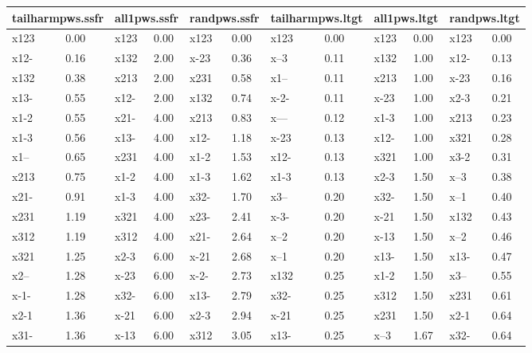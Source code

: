 
\begin{longtable}{| l | l || l | l || l | l || l | l || l | l || l | l |}
\hline
\multicolumn{2}{|c|}{\textbf{tailharmpws.ssfr}} & \multicolumn{2}{|c|}{\textbf{all1pws.ssfr}} & \multicolumn{2}{|c|}{\textbf{randpws.ssfr}} & \multicolumn{2}{|c|}{\textbf{tailharmpws.ltgt}} & \multicolumn{2}{|c|}{\textbf{all1pws.ltgt}} & \multicolumn{2}{|c|}{\textbf{randpws.ltgt}}\\
\hline
x123 & 0.00  & x123 & 0.00  & x123 & 0.00  & x123 & 0.00  & x123 & 0.00  & x123 & 0.00 \\
\hline
x12- & 0.16  & x132 & 2.00  & x-23 & 0.36  & x--3 & 0.11  & x132 & 1.00  & x12- & 0.13 \\
\hline
x132 & 0.38  & x213 & 2.00  & x231 & 0.58  & x1-- & 0.11  & x213 & 1.00  & x-23 & 0.16 \\
\hline
x13- & 0.55  & x12- & 2.00  & x132 & 0.74  & x-2- & 0.11  & x-23 & 1.00  & x2-3 & 0.21 \\
\hline
x1-2 & 0.55  & x21- & 4.00  & x213 & 0.83  & x--- & 0.12  & x1-3 & 1.00  & x213 & 0.23 \\
\hline
x1-3 & 0.56  & x13- & 4.00  & x12- & 1.18  & x-23 & 0.13  & x12- & 1.00  & x321 & 0.28 \\
\hline
x1-- & 0.65  & x231 & 4.00  & x1-2 & 1.53  & x12- & 0.13  & x321 & 1.00  & x3-2 & 0.31 \\
\hline
x213 & 0.75  & x1-2 & 4.00  & x1-3 & 1.62  & x1-3 & 0.13  & x2-3 & 1.50  & x--3 & 0.38 \\
\hline
x21- & 0.91  & x1-3 & 4.00  & x32- & 1.70  & x3-- & 0.20  & x32- & 1.50  & x--1 & 0.40 \\
\hline
x231 & 1.19  & x321 & 4.00  & x23- & 2.41  & x-3- & 0.20  & x-21 & 1.50  & x132 & 0.43 \\
\hline
x312 & 1.19  & x312 & 4.00  & x21- & 2.64  & x--2 & 0.20  & x-13 & 1.50  & x--2 & 0.46 \\
\hline
x321 & 1.25  & x2-3 & 6.00  & x-21 & 2.68  & x--1 & 0.20  & x13- & 1.50  & x13- & 0.47 \\
\hline
x2-- & 1.28  & x-23 & 6.00  & x-2- & 2.73  & x132 & 0.25  & x1-2 & 1.50  & x3-- & 0.55 \\
\hline
x-1- & 1.28  & x32- & 6.00  & x13- & 2.79  & x32- & 0.25  & x312 & 1.50  & x231 & 0.61 \\
\hline
x2-1 & 1.36  & x-21 & 6.00  & x2-3 & 2.94  & x-21 & 0.25  & x231 & 1.50  & x2-1 & 0.64 \\
\hline
x31- & 1.36  & x-13 & 6.00  & x312 & 3.05  & x13- & 0.25  & x--3 & 1.67  & x32- & 0.64 \\

\end{longtable}
